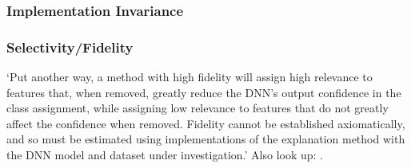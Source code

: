\subsubsection{Implementation Invariance}
\subsubsection{Selectivity/Fidelity}
`Put another way, a method with high fidelity will assign high relevance to features that, when removed, greatly reduce the DNN’s output confidence in the class assignment, while assigning low relevance to features that do not greatly affect the confidence when removed. Fidelity cannot be established axiomatically, and so must be estimated using implementations of the explanation method with the DNN model and dataset under investigation.'\cite{Tomsett.2019} Also look up: \citeauthor{Bach.2015, AlvarezMelis.2018}.